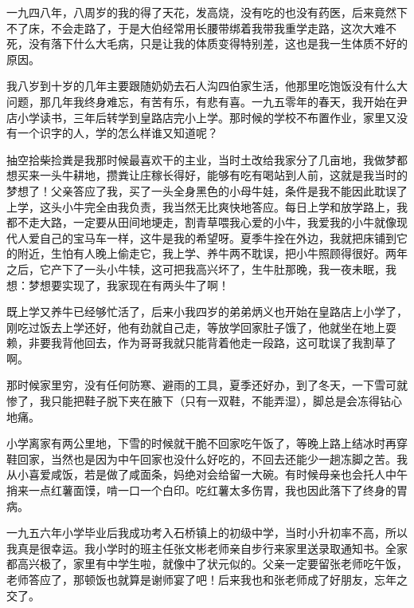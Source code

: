 一九四八年，八周岁的我的得了天花，发高烧，没有吃的也没有药医，后来竟然下不了床，不会走路了，于是大伯经常用长腰带绑着我带我重学走路，这次大难不死，没有落下什么大毛病，只是让我的体质变得特别差，这也是我一生体质不好的原因。

我八岁到十岁的几年主要跟随奶奶去石人沟四伯家生活，他那里吃饱饭没有什么大问题，那几年我终身难忘，有苦有乐，有悲有喜。一九五零年的春天，我开始在尹店小学读书，三年后转学到皇路店完小上学。那时候的学校不布置作业，家里又没有一个识字的人，学的怎么样谁又知道呢？

抽空拾柴捡粪是我那时候最喜欢干的主业，当时土改给我家分了几亩地，我做梦都想买来一头牛耕地，攒粪让庄稼长得好，能够有吃有喝站到人前，这就是我当时的梦想了！父亲答应了我，买了一头全身黑色的小母牛娃，条件是我不能因此耽误了上学，这头小牛完全由我负责，我当然无比爽快地答应。每日上学和放学路上，我都不走大路，一定要从田间地埂走，割青草喂我心爱的小牛，我爱我的小牛就像现代人爱自己的宝马车一样，这牛是我的希望呀。夏季牛拴在外边，我就把床铺到它的附近，生怕有人晚上偷走它，我上学、养牛两不耽误，把小牛照顾得很好。两年之后，它产下了一头小牛犊，这可把我高兴坏了，生牛肚那晚，我一夜未眠，我想：梦想要实现了，我家现在有两头牛了啊！

既上学又养牛已经够忙活了，后来小我四岁的弟弟炳义也开始在皇路店上小学了，刚吃过饭去上学还好，他有劲就自己走，等放学回家肚子饿了，他就坐在地上耍赖，非要我背他回去，作为哥哥我就只能背着他走一段路，这可耽误了我割草了啊。

那时候家里穷，没有任何防寒、避雨的工具，夏季还好办，到了冬天，一下雪可就惨了，我只能把鞋子脱下夹在腋下（只有一双鞋，不能弄湿），脚总是会冻得钻心地痛。

小学离家有两公里地，下雪的时候就干脆不回家吃午饭了，等晚上路上结冰时再穿鞋回家，当然也是因为中午回家也没什么好吃的，不回去还能少一趟冻脚之苦。我从小喜爱咸饭，若是做了咸面条，妈绝对会给留一大碗。有时候母亲也会托人中午捎来一点红薯面馍，啃一口一个白印。吃红薯太多伤胃，我也因此落下了终身的胃病。

一九五六年小学毕业后我成功考入石桥镇上的初级中学，当时小升初率不高，所以我真是很幸运。我小学时的班主任张文彬老师亲自步行来家里送录取通知书。全家都高兴极了，家里有中学生啦，就像中了状元似的。父亲一定要留张老师吃午饭，老师答应了，那顿饭也就算是谢师宴了吧！后来我也和张老师成了好朋友，忘年之交了。

